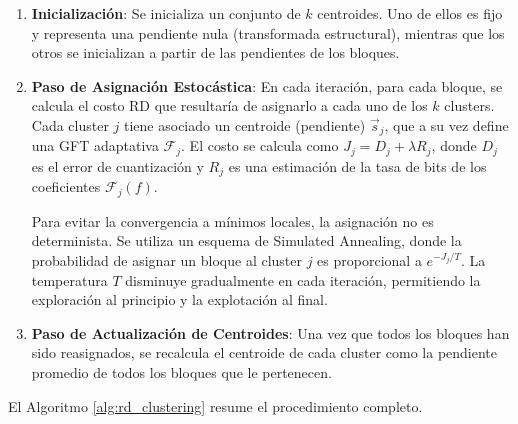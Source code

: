 \begin{enumerate}
\item \textbf{Inicialización}: Se inicializa un conjunto de $k$ centroides. Uno de ellos es fijo y representa una
pendiente nula (transformada estructural), mientras que los otros se inicializan a partir de las pendientes de los
bloques.

\item \textbf{Paso de Asignación Estocástica}: En cada iteración, para cada bloque, se calcula el costo RD que
resultaría de asignarlo a cada uno de los $k$ clusters. Cada cluster $j$ tiene asociado un centroide (pendiente)
$\vec{s}_j$, que a su vez define una GFT adaptativa $\mathcal{F}_j$. El costo se calcula como $J_j = D_j + \lambda
R_j$, donde $D_j$ es el error de cuantización y $R_j$ es una estimación de la tasa de bits de los coeficientes
$\mathcal{F}_j(f)$.

Para evitar la convergencia a mínimos locales, la asignación no es determinista. Se utiliza un esquema de Simulated
Annealing, donde la probabilidad de asignar un bloque al cluster $j$ es proporcional a $e^{-J_j/T}$. La temperatura
$T$ disminuye gradualmente en cada iteración, permitiendo la exploración al principio y la explotación al final.

\item \textbf{Paso de Actualización de Centroides}: Una vez que todos los bloques han sido reasignados, se recalcula
el centroide de cada cluster como la pendiente promedio de todos los bloques que le pertenecen.
\end{enumerate}

El Algoritmo \ref{alg:rd_clustering} resume el procedimiento completo.

